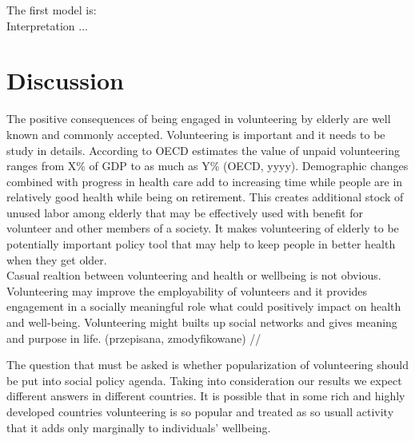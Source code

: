 \documentclass[10pt, letterpaper]{article}
\begin{document}
\begin{spacing}{1.4}
 The first model is: \\




%
%
%


Interpretation ...  
 
\section{Discussion}


The positive consequences of being engaged in volunteering by elderly are well known and commonly accepted. Volunteering is important and it needs to be study in details.  According to OECD estimates the value of unpaid volunteering ranges from X\% of GDP to as much as Y\% (OECD, yyyy).  Demographic changes combined with progress in health care add to increasing time while people are in relatively good health while being on retirement. This creates additional  stock of unused labor among elderly that may be effectively used with benefit for volunteer and other members of a society.  It makes   volunteering of elderly to be potentially important policy tool that may help to keep people in better health when they get older. \\


Casual realtion between volunteering  and health or wellbeing is not obvious. Volunteering may improve the employability of volunteers and it provides engagement in a socially meaningful role  what could positively impact on health and well-being. Volunteering might builts up social networks and gives meaning and purpose in life. (przepisana, zmodyfikowane) //

The question that must be asked is whether popularization of volunteering should be put into social policy agenda. Taking into consideration our results we expect different answers in different countries. It is possible that in some rich and highly developed countries volunteering is so popular and treated as so usuall activity that it adds only marginally to individuals' wellbeing. 


\end{spacing}
\end{document}
